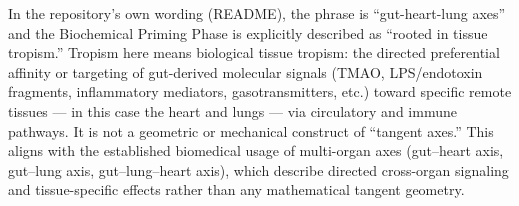 In the repository’s own wording (README), the phrase is “gut-heart-lung axes” and the Biochemical Priming Phase is explicitly described as “rooted in tissue tropism.”
Tropism here means biological tissue tropism: the directed preferential affinity or targeting of gut-derived molecular signals (TMAO, LPS/endotoxin fragments, inflammatory mediators, gasotransmitters, etc.) toward specific remote tissues — in this case the heart and lungs — via circulatory and immune pathways. It is not a geometric or mechanical construct of “tangent axes.”
This aligns with the established biomedical usage of multi-organ axes (gut–heart axis, gut–lung axis, gut–lung–heart axis), which describe directed cross-organ signaling and tissue-specific effects rather than any mathematical tangent geometry.

